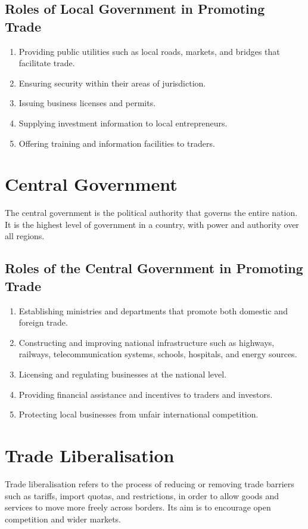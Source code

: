 \documentclass[14pt,a4paper, openany]{book}
\begin{document}
\subsection{Roles of Local Government in Promoting Trade}
\begin{enumerate}
	\item Providing public utilities such as local roads, markets, and bridges that facilitate trade.
	\item Ensuring security within their areas of jurisdiction.
	\item Issuing business licenses and permits.
	\item Supplying investment information to local entrepreneurs.
	\item Offering training and information facilities to traders.
\end{enumerate}

\section{Central Government}
The central government is the political authority that governs the entire nation.
It is the highest level of government in a country, with power and authority over all regions.

\subsection{Roles of the Central Government in Promoting Trade}
\begin{enumerate}
	\item Establishing ministries and departments that promote both domestic and foreign trade.
	\item Constructing and improving national infrastructure such as highways, railways, telecommunication systems, schools, hospitals, and energy sources.
	\item Licensing and regulating businesses at the national level.
	\item Providing financial assistance and incentives to traders and investors.
	\item Protecting local businesses from unfair international competition.
\end{enumerate}

\section{Trade Liberalisation}
Trade liberalisation refers to the process of reducing or removing trade barriers such as tariffs, import quotas, and restrictions,
in order to allow goods and services to move more freely across borders.
Its aim is to encourage open competition and wider markets.
\end{document}
